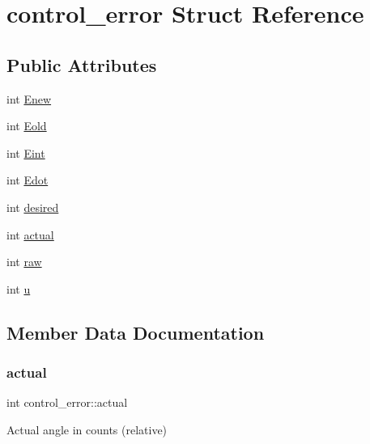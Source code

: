 \hypertarget{structcontrol__error}{}\section{control\+\_\+error Struct Reference}
\label{structcontrol__error}
\subsection*{Public Attributes}
\begin{DoxyCompactItemize}
\item 
int \mbox{\hyperlink{structcontrol__error_a520d0aa203dfb6a8fc2ef6ea67742634}{Enew}}
\item 
int \mbox{\hyperlink{structcontrol__error_a544db3cda64df9fdd64338941e583d3c}{Eold}}
\item 
int \mbox{\hyperlink{structcontrol__error_a0134001840bac616204e9b36ce7fc53e}{Eint}}
\item 
int \mbox{\hyperlink{structcontrol__error_a5a4f2cb0d9739ecbc2391462d4b0f07d}{Edot}}
\item 
int \mbox{\hyperlink{structcontrol__error_a50083d46933f91ac7af1ab23eda49ddb}{desired}}
\item 
int \mbox{\hyperlink{structcontrol__error_a45eeafb4f62fb62128e4f1dde8b134db}{actual}}
\item 
int \mbox{\hyperlink{structcontrol__error_a872f13c1886cb584b7043e668b188548}{raw}}
\item 
int \mbox{\hyperlink{structcontrol__error_aea13c87eda1433f414ce28363a3c9d07}{u}}
\end{DoxyCompactItemize}


\subsection{Member Data Documentation}
\mbox{\label{structcontrol__error_a45eeafb4f62fb62128e4f1dde8b134db}} 
\subsubsection{\texorpdfstring{actual}{actual}}
{\footnotesize\ttfamily int control\+\_\+error\+::actual}

Actual angle in counts (relative) \mbox{\label{structcontrol__error_a50083d46933f91ac7af1ab23eda49ddb}} 

